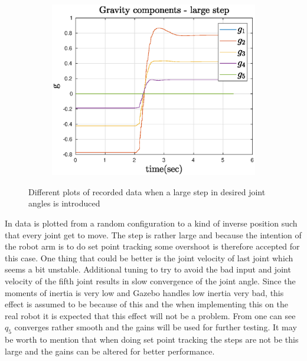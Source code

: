 \begin{figure}[htbp]
    ~
    \begin{subfigure}[htbp]{0.45\textwidth}
        \centering
        \includegraphics[width = \picsSiz\linewidth]{img/LSgrav.eps}
        \caption{ }
    \end{subfigure}
    \caption{Different plots of recorded data when a large step in desired joint angles is introduced}
    \label{fig:LS}
\end{figure}
In  data is plotted from a random configuration to a kind of inverse position such that every joint get to move. The step is rather large and because the intention of the robot arm is to do set point tracking some overshoot is therefore accepted for this case.  One thing that could be better is the joint velocity of last joint which seems a bit unstable. Additional tuning to try to avoid the bad input and joint velocity of the fifth joint results in slow convergence of the joint angle. Since the moments of inertia is very low and Gazebo handles low inertia very bad, this effect is assumed to be because of this and the when implementing this on the real robot it is expected that this effect will not be a problem. From  one can see $q_5$ converges rather smooth and the gains will be used for further testing. It may be worth to mention that when doing set point tracking the steps are not be this large and the gains can be altered for better performance.  \\\\






